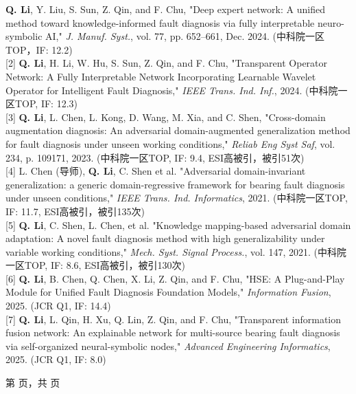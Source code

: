 \documentclass[oneside]{article}
\begin{document}
{\begin{minipage}[t][\dimexpr\textheight-2\fboxrule-2\fboxsep\relax][t]{\dimexpr0.6\textwidth-2\fboxrule-2\fboxsep\relax}
\begin{justify}
        [1] \textbf{Q. Li}, Y. Liu, S. Sun, Z. Qin, and F. Chu, "Deep expert network: A unified method toward knowledge-informed fault diagnosis via fully interpretable neuro-symbolic AI," \textit{J. Manuf. Syst.}, vol. 77, pp. 652–661, Dec. 2024. (中科院一区TOP，IF: 12.2) \\[0.5ex]

        [2] \textbf{Q. Li}, H. Li, W. Hu, S. Sun, Z. Qin, and F. Chu, "Transparent Operator Network: A Fully Interpretable Network Incorporating Learnable Wavelet Operator for Intelligent Fault Diagnosis," \textit{IEEE Trans. Ind. Inf.}, 2024. (中科院一区TOP, IF: 12.3) \\[0.5ex]

        [3] \textbf{Q. Li}, L. Chen, L. Kong, D. Wang, M. Xia, and C. Shen, "Cross-domain augmentation diagnosis: An adversarial domain-augmented generalization method for fault diagnosis under unseen working conditions," \textit{Reliab Eng Syst Saf}, vol. 234, p. 109171, 2023. (中科院一区TOP, IF: 9.4, ESI高被引，被引51次) \\[0.5ex]

        [4] L. Chen (导师), \textbf{Q. Li}, C. Shen et al. "Adversarial domain-invariant generalization: a generic domain-regressive framework for bearing fault diagnosis under unseen conditions," \textit{IEEE Trans. Ind. Informatics}, 2021. (中科院一区TOP, IF: 11.7, ESI高被引，被引135次) \\[0.5ex]

        [5] \textbf{Q. Li}, C. Shen, L. Chen, et al. "Knowledge mapping-based adversarial domain adaptation: A novel fault diagnosis method with high generalizability under variable working conditions," \textit{Mech. Syst. Signal Process.}, vol. 147, 2021. (中科院一区TOP, IF: 8.6, ESI高被引，被引130次) \\[0.5ex]

        [6] \textbf{Q. Li}, B. Chen, Q. Chen, X. Li, Z. Qin, and F. Chu, "HSE: A Plug-and-Play Module for Unified Fault Diagnosis Foundation Models," \textit{Information Fusion}, 2025. (JCR Q1, IF: 14.4) \\[0.5ex]

        [7] \textbf{Q. Li}, L. Qin, H. Xu, Q. Lin, Z. Qin, and F. Chu, "Transparent information fusion network: An explainable network for multi-source bearing fault diagnosis via self-organized neural-symbolic nodes," \textit{Advanced Engineering Informatics}, 2025. (JCR Q1, IF: 8.0)
        \end{justify}
        {\hfill\small{}\selectfont 第 \thepage 页，共 \pageref{LastPage} 页\hfill}
    \end{minipage}
}
\end{document}
